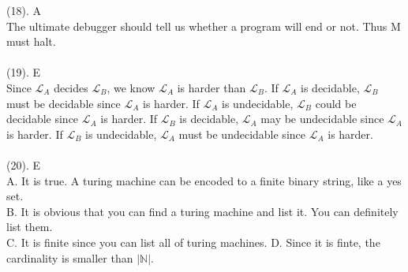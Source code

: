 \documentclass{article}
\begin{document}
	(18). A\\
	The ultimate debugger should tell us whether a program will end or not. Thus M must halt.\\\\
	(19). E\\
	Since $\mathcal{L}_A$ decides $\mathcal{L}_B$, we know $\mathcal{L}_A$ is harder than $\mathcal{L}_B$. If $\mathcal{L}_A$ is decidable, $\mathcal{L}_B$ must be decidable since $\mathcal{L}_A$ is harder. If $\mathcal{L}_A$ is undecidable, $\mathcal{L}_B$ could be decidable since $\mathcal{L}_A$ is harder. If $\mathcal{L}_B$ is decidable, $\mathcal{L}_A$ may be undecidable since $\mathcal{L}_A$ is harder.  If $\mathcal{L}_B$ is undecidable, $\mathcal{L}_A$ must be undecidable since $\mathcal{L}_A$ is harder.\\\\
	(20). E\\
	A. It is true. A turing machine can be encoded to a finite binary string, like a yes set.\\
	B. It is obvious that you can find a turing machine and list it. You can definitely list them.\\
	C. It is finite since you can list all of turing machines.
	D. Since it is finte, the cardinality is smaller than $|\mathbb{N}|$. 
	\newpage
\end{document}
